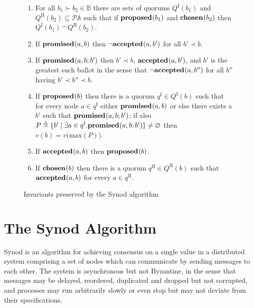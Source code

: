\documentclass[journal]{IEEEtran}
\begin{document}
\begin{figure*}[t!]
\caption{Invariants preserved by the Synod algorithm\label{synod-invariants-figure}}

\renewcommand{\theenumi}{S\arabic{enumi}}

\begin{enumerate}

\item \label{synod-quorums} For all $b_1 \succ b_2 \in \mathbb B$ there are
  sets of quorums $Q^\textrm{I}(b_1)$ and $Q^\textrm{II}(b_2) \subseteq
  \mathcal P \mathbb A$ such that if $\mathbf{proposed}_{}(b_1)$ and $\mathbf{chosen}_{}(b_2)$ then
  ${Q^\textrm{I}(b_1) \frown Q^\textrm{II}(b_2)}$.

\item \label{synod-fprom} If $\mathbf{promised}_{}(a,b)$ then $\neg\mathbf{accepted}_{}(a,b')$ for all
  ${b' \prec b}$.

\item \label{synod-bprom} If $\mathbf{promised}_{}(a,b;b')$ then $b' \prec b$,
  $\mathbf{accepted}_{}(a,b')$, and $b'$ is the greatest such ballot in the sense that
  $\neg\mathbf{accepted}_{}(a,b'')$ for all $b''$ having $b' \prec b'' \prec b$.

\item \label{synod-prop} If $\mathbf{proposed}_{}(b)$ then there is a quorum $q^\textrm{I}
  \in Q^\textrm{I}(b)$ such that for every node $a \in q^\textrm{I}$ either
  $\mathbf{promised}_{}(a,b)$ or else there exists a $b'$ such that $\mathbf{promised}_{}(a,b;b')$;
  if also ${P \triangleq \{ b' \mid \exists a \in q^\textrm{I}.
  \mathbf{promised}_{}(a,b;b') \} \ne \varnothing}$ then $v(b) =
  v\bigl(\mathrm{max}(P)\bigr)$.

\item \label{synod-acc} If $\mathbf{accepted}_{}(a,b)$ then $\mathbf{proposed}_{}(b)$.

\item \label{synod-chosen} If $\mathbf{chosen}_{}(b)$ then there is a quorum
  $q^\textrm{II} \in Q^\textrm{II}(b)$ such that $\mathbf{accepted}_{}(a,b)$ for every $a
  \in q^\textrm{II}$.

\end{enumerate}
\end{figure*}

\section{The Synod Algorithm}\label{synod-text}

Synod\cite{part-time-parliament} is an algorithm for achieving consensus on a
single value in a distributed system comprising a set of nodes which can
communicate by sending messages to each other. The system is asynchronous but
not Byzantine, in the sense that messages may be delayed, reordered, duplicated
and dropped but not corrupted, and processes may run arbitrarily slowly or even
stop but may not deviate from their specifications.
\end{document}
